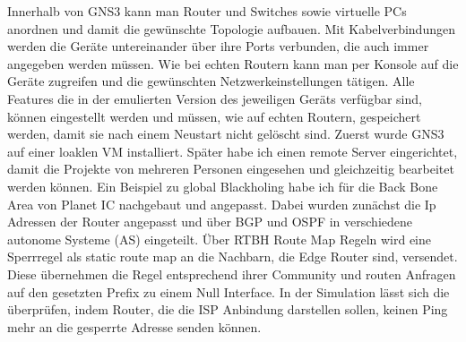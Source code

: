\documentclass[english,runningheads,a4paper]{llncs}[2018/03/10]
\begin{document}
Innerhalb von GNS3 kann man Router und Switches sowie virtuelle PCs anordnen und damit die gewünschte Topologie aufbauen. Mit Kabelverbindungen werden die Geräte untereinander über ihre Ports verbunden, die auch immer angegeben werden müssen. Wie bei echten Routern kann man per Konsole auf die Geräte zugreifen und die gewünschten Netzwerkeinstellungen tätigen. Alle Features die in der emulierten Version des jeweiligen Geräts verfügbar sind, können eingestellt werden und müssen, wie auf echten Routern, gespeichert werden, damit sie nach einem Neustart nicht gelöscht sind.
Zuerst wurde GNS3 auf einer loaklen VM installiert. Später habe ich einen remote Server eingerichtet, damit die Projekte von mehreren Personen eingesehen und gleichzeitig bearbeitet werden können.  Ein Beispiel zu global Blackholing habe ich für die Back Bone Area von Planet IC nachgebaut und angepasst. Dabei wurden zunächst die Ip Adressen der Router angepasst und über BGP und OSPF in verschiedene autonome Systeme (AS) eingeteilt. Über RTBH Route Map Regeln wird eine Sperrregel als static route map an die Nachbarn, die Edge Router sind, versendet. Diese übernehmen die Regel entsprechend ihrer Community und routen Anfragen auf den gesetzten Prefix zu einem Null Interface. In der Simulation lässt sich die überprüfen, indem Router, die die ISP Anbindung darstellen sollen, keinen Ping mehr an die gesperrte Adresse senden können.
\end{document}
